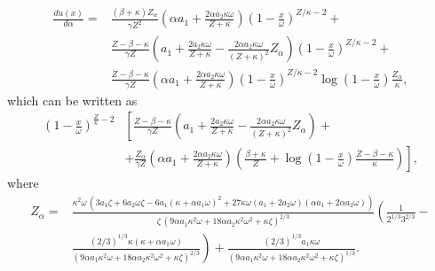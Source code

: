 \documentclass{article}
\begin{document}
\begin{appendices}
\begin{equation}\label{eq:da}
\begin{split}
  \frac{d u(x)}{d\alpha} =& \frac{(\beta+\kappa)Z_{\alpha}}{\gamma Z^2}\left(\alpha a_1 + \frac{2\alpha a_2 \kappa\omega}{Z+\kappa}\right)\left(1-\frac{x}{\omega}\right)^{Z/\kappa-2}+\\
&  \frac{Z-\beta-\kappa}{\gamma Z}\left(a_1+ \frac{2 a_2 \kappa\omega}{Z+\kappa}-\frac{2 \alpha a_2\kappa\omega}{(Z+\kappa)^2}Z_{\alpha}\right)\left(1-\frac{x}{\omega}\right)^{Z/\kappa-2}+\\ 
& \frac{Z-\beta-\kappa}{\gamma Z}\left(\alpha a_1+ \frac{2\alpha a_2 \kappa\omega}{Z+\kappa}
\right)\left(1-\frac{x}{\omega}\right)^{Z/\kappa-2}\log\left(1-\frac{x}{\omega}\right)\frac{Z_{\alpha}}{\kappa}, 
  \end{split}
\end{equation}
which can be written as
\begin{equation}\begin{split}
\left(1-\frac{x}{\omega}\right)^{\frac{Z}{\kappa}-2}&\left[ 
\frac{Z-\beta-\kappa}{\gamma Z}\left(a_1+ \frac{2 a_2 \kappa\omega}{Z+\kappa}-\frac{2 \alpha a_2\kappa\omega}{(Z+\kappa)^2}Z_{\alpha}\right) + \right.\\
&\left.+\frac{Z_{\alpha}}{\gamma Z}\left(\alpha a_1 + \frac{2\alpha a_2 \kappa\omega}{Z+\kappa}\right)
  \left(\frac{\beta+\kappa}{Z}+ \log\left(1-\frac{x}{\omega}\right)\frac{Z-\beta-\kappa}{\kappa}\right) \right], 
\end{split}\end{equation}
where
\begin{equation}\begin{split}
Z_{\alpha}= &\frac{\kappa^2 \omega\,(3 a_1 \zeta+6 a_2  \omega \zeta -6 a_1 (\kappa+\alpha a_1 \omega)^2 + 27\kappa\omega( a_1  + 2 a_2 \omega)(\alpha a_1 + 2 \alpha a_2 \omega))}
{\zeta\, (9 \alpha a_1 \kappa^2 \omega + 18 \alpha a_2 \kappa^2 \omega^2 + \kappa \zeta)^{2/3}}\left(
\frac1{2^{1/3}3^{2/3}}-\right.\\
&\left. \frac{(2/3)^{1/3} \kappa ( \kappa + \alpha a_1\omega)}{(9 \alpha a_1 \kappa^2 \omega + 18 \alpha a_2 \kappa^2 \omega^2 + \kappa \zeta)^{2/3}}\right)+\frac{(2/3)^{1/3}a_1 \kappa\omega}{(9 \alpha a_1 \kappa^2 \omega + 18 \alpha a_2 \kappa^2 \omega^2 + \kappa \zeta)^{1/3}}.
\end{split}\end{equation}


\bigskip


\end{appendices}
\end{document}
